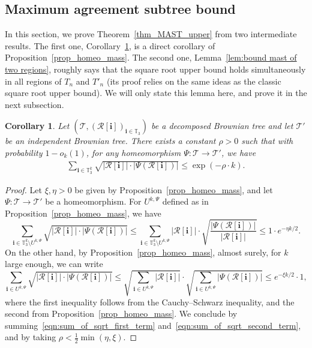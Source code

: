 \documentclass[11pt]{article}
\newcommand{\Tt}{\mathcal{T}}
\newcommand{\Rr}{\mathcal{R}}
\newcommand{\ii}{\mathbf{i}}
\theoremstyle{plain}
\newtheorem{corollary}[theorem]{Corollary}
\theoremstyle{definition}
\numberwithin{equation}{section}
\begin{document}
\subsection{Maximum agreement subtree bound}
In this section, we prove Theorem~\ref{thm_MAST_upper} from two intermediate results.
The first one, Corollary~\ref{prop:sum sqrt prod mass}, is a direct corollary of Proposition~\ref{prop_homeo_mass}. The second one, Lemma~\ref{lem:bound mast of two regions}, roughly says that the square root upper bound holds simultaneously in all regions of $T_n$ and $T'_n$ (its proof relies on the same ideas as the classic square root upper bound).
We will only state this lemma here, and prove it in the next subsection.
\begin{corollary}\label{prop:sum sqrt prod mass}
Let $\left( \mathcal{T}, \left( \Rr[\ii] \right)_{\ii \in \mathbb{T}_3} \right)$ be a decomposed Brownian tree and let $\mathcal{T}'$ be an independent Brownian tree. There exists a constant $\rho>0$ such that with probability $1-o_k(1)$, for any homeomorphism $\Psi: \mathcal T \rightarrow \mathcal{T}'$, we have\vspace*{-3pt}
\begin{align*}
\sum_{\ii \in \mathbb{T}_3^k} \sqrt{|\Rr[\ii] | \cdot |\Psi(\Rr[\ii] )|} \leq \exp(- \rho \cdot k).
\end{align*}
\end{corollary}
\begin{proof}
Let $\xi, \eta>0$ be given by Proposition~\ref{prop_homeo_mass}, and let $\Psi : \Tt \to \Tt'$ be a homeomorphism.
For $U^{k,\Psi}$ defined as in Proposition~\ref{prop_homeo_mass}, we have\vspace*{-3pt}
\begin{equation}\label{eqn:sum_of_sqrt_first_term}
\sum_{\ii \in \mathbb{T}_3^k\setminus U^{k,\Psi}} \sqrt{|\Rr[\ii] | \cdot |\Psi(\Rr[\ii] )|} \leq \sum_{\ii \in \mathbb{T}_3^k\setminus U^{k,\Psi}} |\Rr[\ii] | \cdot \sqrt{ \frac{|\Psi(\Rr[\ii] )|}{|\Rr[\ii] |}} \leq 1 \cdot e^{-\eta k/2}.
\end{equation}
On the other hand, by Proposition~\ref{prop_homeo_mass}, almost surely, for $k$ large enough, we can write\vspace*{-3pt}
\begin{equation}\label{eqn:sum_of_sqrt_second_term}
\sum_{\ii \in U^{k,\Psi}} \sqrt{|\Rr[\ii] | \cdot |\Psi(\Rr[\ii] )|} \leq \sqrt{\sum_{\ii \in U^{k,\Psi}} |\Rr[\ii] | }\cdot \sqrt{\sum_{\ii \in U^{k,\Psi}} |\Psi(\Rr[\ii] )|} \leq e^{-\xi k/2} \cdot 1,
\end{equation}
where the first inequality follows from the Cauchy--Schwarz inequality, and the second from Proposition~\ref{prop_homeo_mass}. We conclude by summing~\eqref{eqn:sum_of_sqrt_first_term} and~\eqref{eqn:sum_of_sqrt_second_term}, and by taking $\rho<\frac{1}{2}\min(\eta, \xi)$.
\end{proof}
\end{document}
